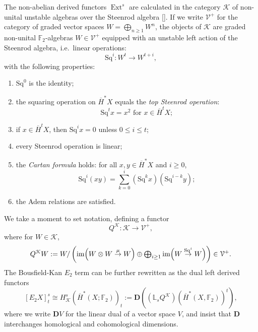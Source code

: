 \documentclass[11pt]{amsart} \renewcommand{\baselinestretch}{1.4}
\theoremstyle{plain}
\theoremstyle{definition}
\DeclareMathOperator{\Ext}{Ext}
\DeclareMathOperator{\im}{im}
\renewcommand{\to}{\longrightarrow}
\newcommand{\calV}{\mathcal{V}}
\newcommand{\cala}{\mathcal{A}}
\newcommand{\calk}{\mathcal{K}}
\newcommand{\calc}{\mathcal{C}}
\newcommand{\citeBOX}[2][]{\cite[\mbox{#1}]{#2}}
\newcommand{\vect}[2]{\calV^{#1}_{#2}}
\newcommand{\Sq}{\mathrm{Sq}}
\newcommand{\F}{\mathbb{F}}
\newcommand{\Ftwo}{\F_2}
\newcommand{\E}[5]{[E^{#1}_{#2}#3]^{#4}_{#5}}
\newcommand{\dual}{\mathbf{D}}
\begin{document}
\begin{Introduction}
The non-abelian derived functors $\Ext^s$ are calculated in the category 
%
$\calk$ of non-unital unstable algebras over the Steenrod algebra []. If we write $\vect{+}{}$ for the category of graded vector spaces $W=\textstyle \bigoplus_{n\geq 1} W^n$, the objects of $\calk$ are graded non-unital $\Ftwo$-algebras
$W\in\vect{+}{}$
equipped with an unstable left action of the Steenrod algebra, i.e.\ linear operations:
\[\Sq^i: W^t\to W^{t+i},\]
with the following properties:
\begin{enumerate}
\item $\Sq^0$ is the identity;
\item the squaring operation on $\overline{H}^*X$ equals the \emph{top Steenrod operation}:
\[\Sq^{t}x=x^{2}\text{\ \ for $x\in \overline{H}^tX$};\]
\item \label{Sq unstable vanishing intro} if $x\in \overline{H}^tX$, then $\Sq^ix=0$ unless $0\leq i\leq t$;
\item every Steenrod operation is linear;
\item the \emph{Cartan formula} holds:  for all $x,y\in   \overline{H}^*X$ and $i\geq0$,
\[\Sq^i(xy)=\textstyle\sum_{k=0}^{i}(\Sq^kx)(\Sq^{i-k}y);\]
\item the Adem relations are satisfied.
\end{enumerate}
We take a moment to set notation, defining a functor 
\[Q^{\calk}:\calk\to \vect{+}{},\]
where for $W\in\calk$, 
\[Q^{\calk}W:=W/\left(\im\Bigl(W\otimes W\overset{\mu}{\rightarrow} W\Bigr)\oplus\textstyle\bigoplus_{i\geq1}\im\Bigl(W\overset{\Sq^i}{\rightarrow} W\Bigr)\right)\in\vect{+}{}.\]
The Bousfield-Kan $E_2$ term can be further rewritten as the dual left derived functors
\[\E{}{2}{X}{s}{t}\cong H^s_{\calk}(\overline{H}^*(X;\Ftwo))_t:=\dual((\mathbb{L}_sQ^{\calk})(\overline{H}^*(X,\Ftwo) )^t),\]
where we write  $\dual V$ for the linear dual of a vector space $V$, and insist that $\dual$ interchanges homological and cohomological dimensions.




\end{Introduction}
\end{document}
